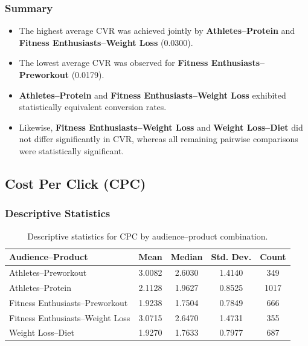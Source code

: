 \subsubsection{Summary}

\begin{itemize}
	\item The highest average CVR was achieved jointly by \textbf{Athletes--Protein} and \textbf{Fitness Enthusiasts--Weight Loss} (0.0300).
	\item The lowest average CVR was observed for \textbf{Fitness Enthusiasts--Preworkout} (0.0179).
	\item \textbf{Athletes--Protein} and \textbf{Fitness Enthusiasts--Weight Loss} exhibited statistically equivalent conversion rates.
	\item Likewise, \textbf{Fitness Enthusiasts--Weight Loss} and \textbf{Weight Loss--Diet} did not differ significantly in CVR, whereas all remaining pairwise comparisons were statistically significant.
\end{itemize}



\subsection{Cost Per Click (CPC)}\label{appendix:audience_product_performance_analysis_CPC}

\subsubsection{Descriptive Statistics}

\begin{table}[H]
	\centering
	\caption{Descriptive statistics for CPC by audience--product combination.}
	\begin{tabular}{lcccc}
		\toprule
		Audience--Product & Mean & Median & Std. Dev. & Count \\
		\midrule
		Athletes--Preworkout & 3.0082 & 2.6030 & 1.4140 & 349 \\
		Athletes--Protein & 2.1128 & 1.9627 & 0.8525 & 1017 \\
		Fitness Enthusiasts--Preworkout & 1.9238 & 1.7504 & 0.7849 & 666 \\
		Fitness Enthusiasts--Weight Loss & 3.0715 & 2.6470 & 1.4731 & 355 \\
		Weight Loss--Diet & 1.9270 & 1.7633 & 0.7977 & 687 \\
		\bottomrule
	\end{tabular}
\end{table}

